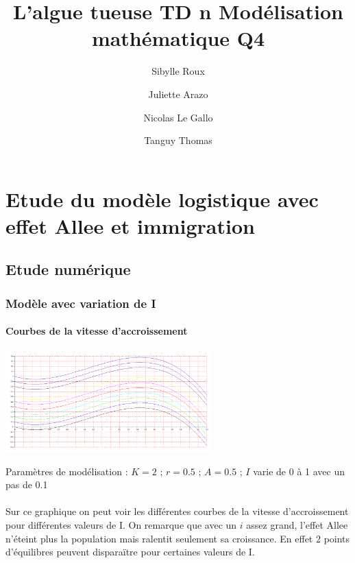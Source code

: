 \documentclass{article}
\begin{document}
\title{L'algue tueuse
	\smallbreak
	TD n
	\smallbreak
	Modélisation mathématique
	\smallbreak
	Q4}
\author{Sibylle Roux \and Juliette Arazo \and Nicolas Le Gallo \and Tanguy Thomas}


\maketitle

\newpage

\tableofcontents

\newpage

\section{Etude du modèle logistique avec effet Allee et immigration}

\subsection{Etude numérique}

\subsubsection{Modèle avec variation de I}

\paragraph{Courbes de la vitesse d'accroissement}
\begin{center}
\includegraphics[width=300px]{img/part1/AlleeI.png}
\end{center}
Paramètres de modélisation : $K=2$  ; $r=0.5$ ; $A=0.5$ ; $I$ varie de 0 à 1 avec un pas de 0.1 
\paragraph{}
Sur ce graphique on peut voir les différentes courbes de la vitesse d'accroissement pour différentes valeurs de I. On remarque que avec un $i$ assez grand, l'effet Allee n'éteint plus la population mais ralentit seulement sa croissance. En effet 2 points d'équilibres peuvent disparaïtre pour certaines valeurs de I.
\end{document}
